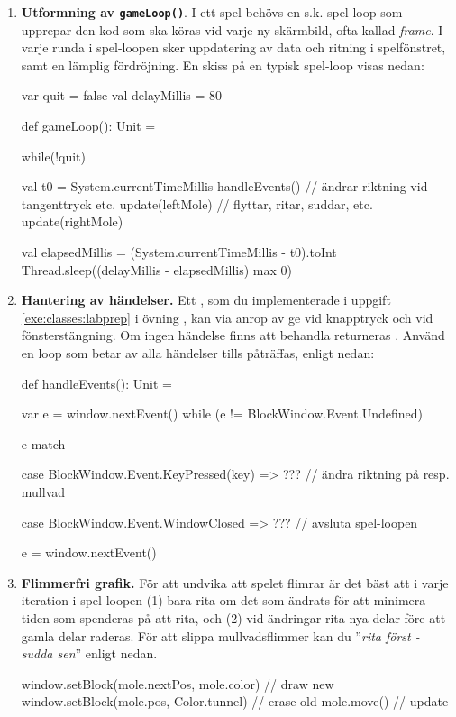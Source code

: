 \begin{enumerate}[leftmargin=*]
\item \textbf{Utformning av \texttt{gameLoop()}}. I ett spel behövs en s.k. spel-loop  som upprepar den kod som ska köras vid varje ny skärmbild, ofta kallad \emph{frame}. I varje runda i spel-loopen sker uppdatering av data och ritning i spelfönstret, samt en lämplig fördröjning. En skiss på en typisk spel-loop visas nedan:
\begin{CodeSmall}
  var quit = false
  val delayMillis = 80

  def gameLoop(): Unit = {
    while(!quit) {
      val t0 = System.currentTimeMillis
      handleEvents()    // ändrar riktning vid tangenttryck etc.
      update(leftMole)  // flyttar, ritar, suddar, etc.
      update(rightMole)

      val elapsedMillis = (System.currentTimeMillis - t0).toInt
      Thread.sleep((delayMillis - elapsedMillis) max 0)
    }
  }
\end{CodeSmall}

\item \textbf{Hantering av händelser.} Ett , som du implementerade i uppgift \ref{exe:classes:labprep} i övning \texttt{\ExeWeekFIVE}, kan via anrop av  ge    vid knapptryck och  vid fönsterstängning. Om ingen händelse finns att behandla returneras . Använd en loop som betar av alla händelser tills  påträffas, enligt nedan:

\begin{CodeSmall}
  def handleEvents(): Unit = {
    var e = window.nextEvent()
    while (e != BlockWindow.Event.Undefined) {
      e match {
        case BlockWindow.Event.KeyPressed(key) =>
          ???  // ändra riktning på resp. mullvad

        case BlockWindow.Event.WindowClosed =>
          ???  // avsluta spel-loopen
      }
      e = window.nextEvent()
    }
  }
\end{CodeSmall}

\item \textbf{Flimmerfri grafik.} För att undvika att spelet flimrar  är det bäst att i varje iteration i spel-loopen (1) bara rita om det som ändrats för att minimera tiden som spenderas på att rita, och (2) vid ändringar rita nya delar före att gamla delar raderas. För att slippa mullvadsflimmer kan du ''\emph{rita först - sudda sen}'' enligt nedan.


\begin{CodeSmall}
window.setBlock(mole.nextPos, mole.color) // draw new
window.setBlock(mole.pos, Color.tunnel)   // erase old
mole.move()                               // update
\end{CodeSmall}

\end{enumerate}
